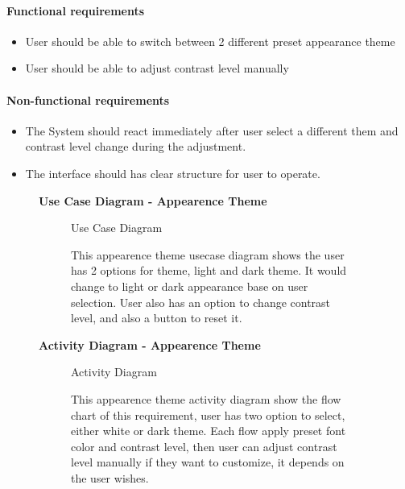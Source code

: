 \documentclass{article}
\begin{document}
		\paragraph{Functional requirements}
		\begin{itemize}
			\item User should be able to switch between 2 different preset appearance theme 
			\item User should be able to adjust contrast level manually
		\end{itemize}
		
		\paragraph{Non-functional requirements}
		\begin{itemize}
			\item The System should react immediately after user select a different them and contrast level change during the adjustment.
			\item The interface should has clear structure for user to operate.
		\end{itemize}

		\clearpage
	

	\begin{figure}[htbp]
		\textbf{Use Case Diagram - Appearence Theme }
		\centering
		\begin{subfigure}{\textwidth}
			\resizebox{\textwidth}{!}{}
			\caption{Use Case Diagram}
		\end{subfigure}
		\begin{subfigure}{\textwidth}
			This appearence theme usecase diagram shows the user has 2 options for theme, light and dark theme. It would
			change to light or dark appearance base on user selection. User also has an option to change contrast level, and also a button to reset it.
		\end{subfigure}
	\end{figure}

	\clearpage

		\begin{figure}[htbp]
			\textbf{ Activity Diagram - Appearence Theme }
			\centering
			\begin{subfigure}{\textwidth}
				\resizebox{\textwidth}{!}{}
				\caption{Activity Diagram}
			\end{subfigure}
			\begin{subfigure}{\textwidth}
				This appearence theme activity diagram show the flow chart of this requirement, user has two option to select, either white or dark theme.
				Each flow apply preset font color and contrast level, then user can adjust contrast level manually if they want to customize, it depends on the 
				user wishes.
			\end{subfigure}
		\end{figure}
		
\end{document}
